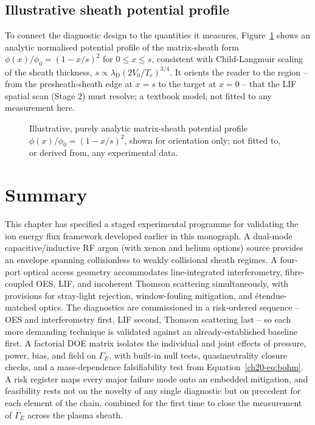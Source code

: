 \subsection{Illustrative sheath potential profile}

To connect the diagnostic design to the quantities it measures, Figure~\ref{fig:sheath-profile} shows an analytic normalised potential profile of the matrix-sheath form $\phi(x)/\phi_{0} = (1-x/s)^{2}$ for $0 \le x \le s$, consistent with Child-Langmuir scaling of the sheath thickness, $s \propto \lambda_{\mathrm{D}} (2V_{0}/T_{\mathrm{e}})^{3/4}$. It orients the reader to the region -- from the presheath-sheath edge at $x=s$ to the target at $x=0$ -- that the LIF spatial scan (Stage 2) must resolve; a textbook model, not fitted to any measurement here.

\begin{figure}[htbp]
\centering
{}
\caption{Illustrative, purely analytic matrix-sheath potential profile $\phi(x)/\phi_{0} = (1-x/s)^{2}$, shown for orientation only; not fitted to, or derived from, any experimental data.}
\label{fig:sheath-profile}
\end{figure}

\section{Summary}

This chapter has specified a staged experimental programme for validating the ion energy flux framework developed earlier in this monograph. A dual-mode capacitive/inductive RF argon (with xenon and helium options) source provides an envelope spanning collisionless to weakly collisional sheath regimes. A four-port optical access geometry accommodates line-integrated interferometry, fibre-coupled OES, LIF, and incoherent Thomson scattering simultaneously, with provisions for stray-light rejection, window-fouling mitigation, and \'etendue-matched optics. The diagnostics are commissioned in a risk-ordered sequence -- OES and interferometry first, LIF second, Thomson scattering last -- so each more demanding technique is validated against an already-established baseline first. A factorial DOE matrix isolates the individual and joint effects of pressure, power, bias, and field on $\Gamma_{E}$, with built-in null tests, quasineutrality closure checks, and a mass-dependence falsifiability test from Equation~\eqref{ch20-eq:bohm}. A risk register maps every major failure mode onto an embedded mitigation, and feasibility rests not on the novelty of any single diagnostic but on precedent for each element of the chain, combined for the first time to close the measurement of $\Gamma_{E}$ across the plasma sheath.
